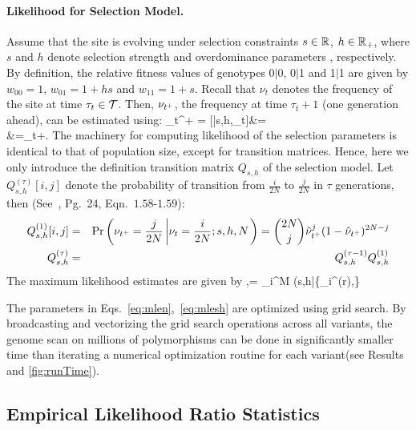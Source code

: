 \paragraph{Likelihood for Selection Model.}
Assume that the site is evolving under selection constraints $s\in
{\mathbb R}$, $h\in {\mathbb R}_+$, where $s$ and $h$ denote selection strength and 
overdominance parameters ,
respectively. By definition, the relative fitness values of genotypes
0$|$0, 0$|$1 and 1$|$1 are given by $w_{00}=1$, $w_{01}=1+hs$ and
$w_{11}=1+s$. Recall that $\nu_t$ denotes the frequency of the site at
time $\tau_t\in {\cal T}$. Then, $\nu_{t^+}$, the frequency at time
$\tau_{t}+1$ (one generation ahead), can be estimated using: \beq 
\hat{\nu}_{t^+} =
[\nusp|s,h,\nu_t]&=\\
&=\nu_t+.
  \label{eq:transition}
\eeq
The machinery for computing likelihood of the selection parameters is 
identical to that of population size, except for transition matrices. Hence, here 
we only introduce the definition transition matrix $Q_{s,h}$ of the selection 
model.
Let $Q^{(\tau)}_{s,h}[i,j]$ denote the
probability of transition from $\frac{i}{2N}$ to $\frac{j}{2N}$ in
$\tau$ generations, then (See~\cite{Ewens2012Mathematical}, Pg.~24, 
Eqn.~$1.58$-$1.59$):
\begin{eqnarray}
  Q^{(1)}_{s,h}[i,j] &=& \operatorname{Pr}\left(\nu_{t^+}=\frac{j}{2N} \left\lvert
      \nu_{t}=\frac{i}{2N};s,h,N \right .\right)={2N \choose j}
  \hat{\nu}_{t^+}^{j} (1-\hat{\nu}_{t^+})^{2N-j}\label{eq:Q1}\\
  Q^{(\tau)}_{s,h} &=& Q^{(\tau-1)}_{s,h}Q^{(1)}_{s,h}\label{eq:Qt}
  \label{eq:mkvs}   
\end{eqnarray}
The maximum likelihood estimates are given by
\beq
\hs,\hh =  \prod_i^M \Lc(s,h|\{_i^{(r)},\hN\} 
\label{eq:mlesh}
\eeq

 The parameters in
 Eqs.~\ref{eq:mlen},~\ref{eq:mlesh} are optimized using grid
 search. By broadcasting and vectorizing the grid search operations
 across all variants, the genome scan on millions of polymorphisms can
 be done in significantly smaller time than iterating a numerical
 optimization routine for each variant(see Results and
 \ref{fig:runTime}).
\subsection{Empirical Likelihood Ratio Statistics}

